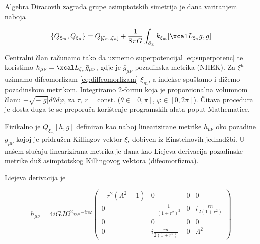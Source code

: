 

\noindent Algebra Diracovih zagrada grupe asimptotskih simetrija je dana variranjem naboja

\begin{equation}
\{Q_{\xi_m},Q_{\xi_n}\}=Q_{[\xi_m,\xi_n]}+\frac{1}{8\pi G}\int_{\partial_\Sigma}k_{\xi_m}[\Lie_{\xi_n}\bar{g},\bar{g}]
\end{equation}

Centralni član računamo tako da uzmemo superpotencijal \eqref{eq:superpotenc} te koristimo  $h_{\mu\nu}=\Lie_{\xi_n}\bar{g}_{\mu\nu}$, gdje je $\bar{g}_{\mu\nu}$ pozadinska metrika (NHEK). Za $\xi^\mu$ uzimamo difeomorfizam \eqref{eq:diffeomorfizam} $\xi_m$, a indekse spuštamo i dižemo pozadinskom metrikom. Integriramo 2-formu koja je proporcionalna volumnom članu $-\sqrt{-|g|} d\theta d\varphi$, za $\tau,\ r=$const. ($\theta\in[0,\pi]$, $\varphi\in[0,2\pi]$). Čitava procedura je dosta duga te se preporuča korištenje programskih alata poput Mathematice.

Fizikalno je $Q_{\xi_m}[h,g]$ definiran kao naboj linearizirane metrike $h_{\mu\nu}$ oko pozadine $g_{\mu\nu}$ kojoj je pridružen Killingov vektor $\xi$, dobiven iz Einsteinovih jednadžbi. U našem slučaju linearizirana metrika je dana kao Liejeva derivacija pozadinske metrike duž asimptotskog Killingovog vektora (difeomorfizma). 

\noindent Liejeva derivacija je

\begin{equation}
h_{\mu\nu}=4i GJ\Omega^2ne^{-in\varphi}
 \begin{pmatrix}
  -r^2(\Lambda^2-1) & 0 & 0 & 0 \\
  0 & -\frac{1}{(1+r^2)^2} & 0 & i\frac{rn}{2(1+r^2)} \\
  0 & 0  & 0 & 0  \\
  0 & i\frac{rn}{2(1+r^2)} & 0 & \Lambda^2
 \end{pmatrix}
\end{equation}

